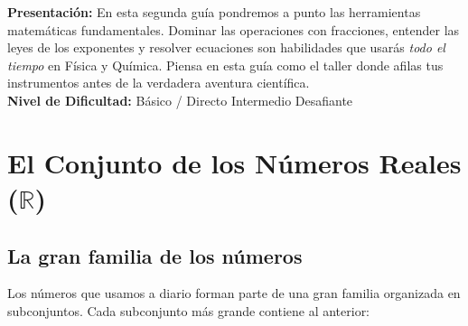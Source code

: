 \documentclass[12pt, letterpaper]{article}
\begin{document}


\vspace{4pt}
\begin{cuadroinfo}
  \small
  \textbf{Presentación:} En esta segunda guía pondremos a punto las herramientas matemáticas fundamentales. Dominar las operaciones con fracciones, entender las leyes de los exponentes y resolver ecuaciones son habilidades que usarás \emph{todo el tiempo} en Física y Química. Piensa en esta guía como el taller donde afilas tus instrumentos antes de la verdadera aventura científica.
  \\[4pt]
  \textbf{Nivel de Dificultad:}\quad
  \facil{} Básico / Directo \quad
  \medio{} Intermedio \quad
  \dificil{} Desafiante
\end{cuadroinfo}

\vspace{8pt}

\section{El Conjunto de los Números Reales ($\mathbb{R}$)}

\subsection{La gran familia de los números}

Los números que usamos a diario forman parte de una gran familia organizada en subconjuntos. Cada subconjunto más grande contiene al anterior:
\end{document}
